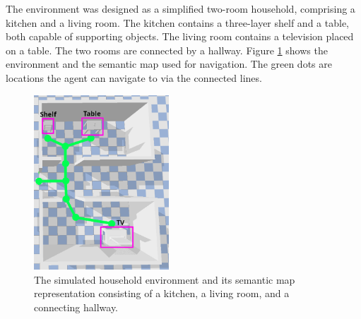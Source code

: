 \documentclass[../report.tex]{subfiles}
\begin{document}
The environment was designed as a simplified two-room household, comprising a kitchen and a living room. The kitchen contains a three-layer shelf and a table, both capable of supporting objects. The living room contains a television placed on a table. The two rooms are connected by a hallway. Figure \ref{fig:environment} shows the environment and the semantic map used for navigation. The green dots are locations the agent can navigate to via the connected lines.

\begin{figure}[h!]
	\centering
	\includegraphics[width=0.45\textwidth]{figures/environment.png}
	\caption{The simulated household environment and its semantic map representation consisting of a kitchen, a living room, and a connecting hallway.}
	\label{fig:environment}
\end{figure}
\end{document}
